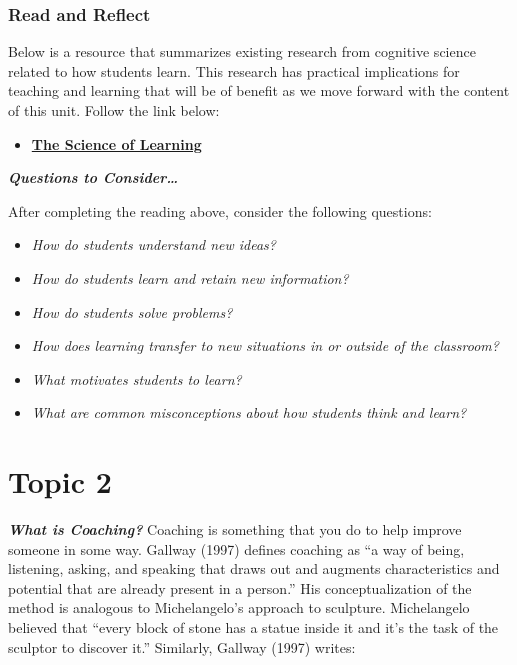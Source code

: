 \documentclass[
]{book}
\providecommand{\tightlist}{%
  \setlength{\itemsep}{0pt}\setlength{\parskip}{0pt}}
\begin{document}
\begin{reflect}
\hypertarget{read-and-reflect-1}{%
\subsubsection{Read and Reflect}\label{read-and-reflect-1}}

Below is a resource that summarizes existing research from cognitive science related to how students learn. This research has practical implications for teaching and learning that will be of benefit as we move forward with the content of this unit. Follow the link below:

\begin{itemize}
\tightlist
\item
  \href{https://deansforimpact.org/wp-content/uploads/2016/12/The_Science_of_Learning.pdf}{\textbf{The Science of Learning}}
\end{itemize}

\textbf{\emph{Questions to Consider\ldots{}}}

After completing the reading above, consider the following questions:

\begin{itemize}
\tightlist
\item
  \emph{How do students understand new ideas?}
\item
  \emph{How do students learn and retain new information?}
\item
  \emph{How do students solve problems?}
\item
  \emph{How does learning transfer to new situations in or outside of the classroom?}
\item
  \emph{What motivates students to learn?}
\item
  \emph{What are common misconceptions about how students think and learn?}
\end{itemize}
\end{reflect}

\hypertarget{topic-2}{%
\section*{Topic 2}\label{topic-2}}

\textbf{\emph{What is Coaching?}} Coaching is something that you do to help improve someone in some way. Gallway (1997) defines coaching as ``a way of being, listening, asking, and speaking that draws out and augments characteristics and potential that are already present in a person.'' His conceptualization of the method is analogous to Michelangelo's approach to sculpture. Michelangelo believed that ``every block of stone has a statue inside it and it's the task of the sculptor to discover it.'' Similarly, Gallway (1997) writes:
\end{document}
